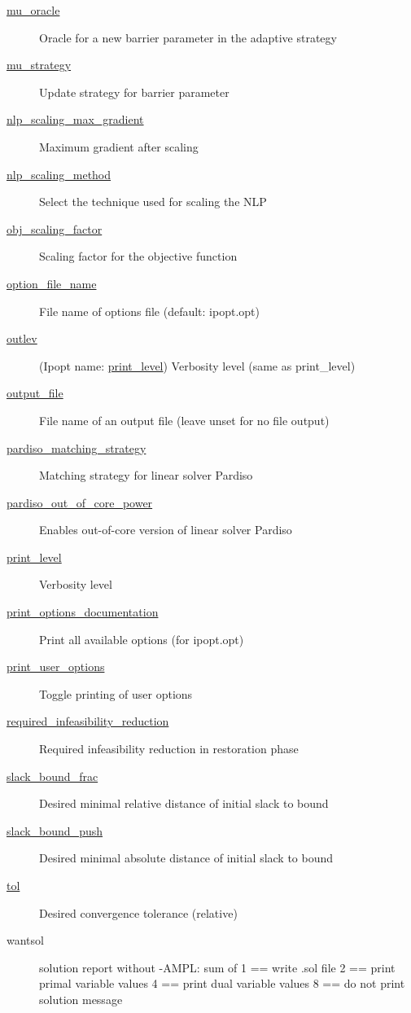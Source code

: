 \begin{description}
\item[{\hyperref[sec:mu_oracle]{mu\_oracle}}] Oracle for a new barrier parameter in the adaptive strategy
\item[{\hyperref[sec:mu_strategy]{mu\_strategy}}] Update strategy for barrier parameter
\item[{\hyperref[sec:nlp_scaling_max_gradient]{nlp\_scaling\_max\_gradient}}] Maximum gradient after scaling
\item[{\hyperref[sec:nlp_scaling_method]{nlp\_scaling\_method}}] Select the technique used for scaling the NLP
\item[{\hyperref[sec:obj_scaling_factor]{obj\_scaling\_factor}}] Scaling factor for the objective function
\item[{\hyperref[sec:option_file_name]{option\_file\_name}}] File name of options file (default: ipopt.opt)
\item[{\hyperref[sec:print_level]{outlev}}] (Ipopt name: \hyperref[sec:print_level]{print\_level}) Verbosity level (same as print\_level)
\item[{\hyperref[sec:output_file]{output\_file}}] File name of an output file (leave unset for no file output)
\item[{\hyperref[sec:pardiso_matching_strategy]{pardiso\_matching\_strategy}}] Matching strategy for linear solver Pardiso
\item[{\hyperref[sec:pardiso_out_of_core_power]{pardiso\_out\_of\_core\_power}}] Enables out-of-core version of linear solver Pardiso
\item[{\hyperref[sec:print_level]{print\_level}}] Verbosity level
\item[{\hyperref[sec:print_options_documentation]{print\_options\_documentation}}] Print all available options (for ipopt.opt)
\item[{\hyperref[sec:print_user_options]{print\_user\_options}}] Toggle printing of user options
\item[{\hyperref[sec:required_infeasibility_reduction]{required\_infeasibility\_reduction}}] Required infeasibility reduction in restoration phase
\item[{\hyperref[sec:slack_bound_frac]{slack\_bound\_frac}}] Desired minimal relative distance of initial slack to bound
\item[{\hyperref[sec:slack_bound_push]{slack\_bound\_push}}] Desired minimal absolute distance of initial slack to bound
\item[{\hyperref[sec:tol]{tol}}] Desired convergence tolerance (relative)
\item[wantsol] solution report without -AMPL: sum of 		1 == write .sol file 		2 == print primal variable values 		4 == print dual variable values 		8 == do not print solution message

\end{description}
